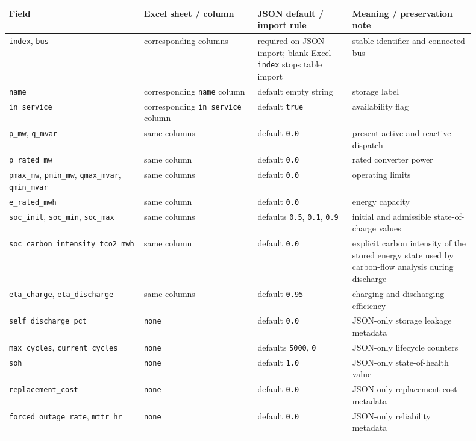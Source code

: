 \begin{longtable}{L{0.20\linewidth}L{0.24\linewidth}L{0.20\linewidth}L{0.26\linewidth}}
\toprule
Field & Excel sheet / column & JSON default / import rule & Meaning / preservation note \\
\midrule
\endhead
\texttt{index}, \texttt{bus} & corresponding columns & required on JSON import; blank Excel \texttt{index} stops table import & stable identifier and connected bus \\
\texttt{name} & corresponding \texttt{name} column & default empty string & storage label \\
\texttt{in\_service} & corresponding \texttt{in\_service} column & default \texttt{true} & availability flag \\
\texttt{p\_mw}, \texttt{q\_mvar} & same columns & default \texttt{0.0} & present active and reactive dispatch \\
\texttt{p\_rated\_mw} & same column & default \texttt{0.0} & rated converter power \\
\texttt{pmax\_mw}, \texttt{pmin\_mw}, \texttt{qmax\_mvar}, \texttt{qmin\_mvar} & same columns & default \texttt{0.0} & operating limits \\
\texttt{e\_rated\_mwh} & same column & default \texttt{0.0} & energy capacity \\
\texttt{soc\_init}, \texttt{soc\_min}, \texttt{soc\_max} & same columns & defaults \texttt{0.5}, \texttt{0.1}, \texttt{0.9} & initial and admissible state-of-charge values \\
\texttt{soc\_carbon\_intensity\_tco2\_mwh} & same column & default \texttt{0.0} & explicit carbon intensity of the stored energy state used by carbon-flow analysis during discharge \\
\texttt{eta\_charge}, \texttt{eta\_discharge} & same columns & default \texttt{0.95} & charging and discharging efficiency \\
\texttt{self\_discharge\_pct} & \texttt{none} & default \texttt{0.0} & JSON-only storage leakage metadata \\
\texttt{max\_cycles}, \texttt{current\_cycles} & \texttt{none} & defaults \texttt{5000}, \texttt{0} & JSON-only lifecycle counters \\
\texttt{soh} & \texttt{none} & default \texttt{1.0} & JSON-only state-of-health value \\
\texttt{replacement\_cost} & \texttt{none} & default \texttt{0.0} & JSON-only replacement-cost metadata \\
\texttt{forced\_outage\_rate}, \texttt{mttr\_hr} & \texttt{none} & default \texttt{0.0} & JSON-only reliability metadata \\
\bottomrule
\end{longtable}

